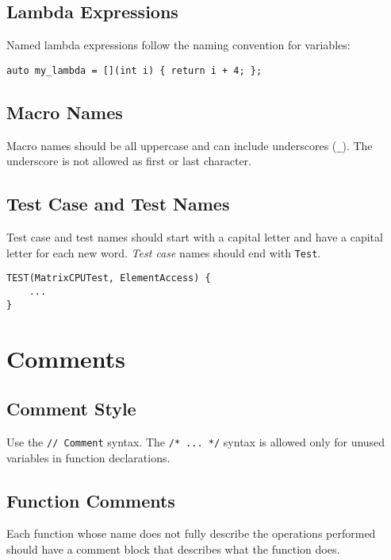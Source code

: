 \documentclass[a4paper]{article}
\newcommand{\inlinecode}[1]{\lstinline|#1|}
\begin{document}
\subsection{Lambda Expressions}

Named lambda expressions follow the naming convention for variables:

\begin{lstlisting}[showspaces=false]
auto my_lambda = [](int i) { return i + 4; };
\end{lstlisting}

\subsection{Macro Names}

Macro names should be all uppercase and can include underscores (\inlinecode{_}).
The underscore is not allowed as first or last character.

\subsection{Test Case and Test Names}

Test case and test names should start with a capital letter and have a capital letter for each new word.
\emph{Test case} names should end with \inlinecode{Test}.

\begin{lstlisting}[showspaces=false]
TEST(MatrixCPUTest, ElementAccess) {
    ...
}
\end{lstlisting}


\section{Comments}

\subsection{Comment Style}

Use the \inlinecode{// Comment} syntax.
The \inlinecode{/* ... */} syntax is allowed only for unused variables in function declarations.

\subsection{Function Comments}

Each function whose name does not fully describe the operations performed should have a comment block that describes what the function does.
\end{document}
